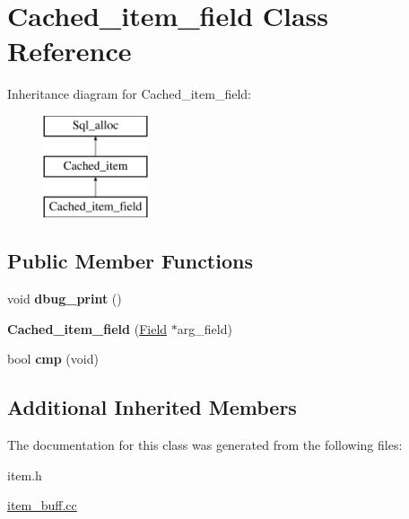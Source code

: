 \hypertarget{classCached__item__field}{}\section{Cached\+\_\+item\+\_\+field Class Reference}
\label{classCached__item__field}
Inheritance diagram for Cached\+\_\+item\+\_\+field\+:\begin{figure}[H]
\begin{center}
\leavevmode
\includegraphics[height=3.000000cm]{classCached__item__field}
\end{center}
\end{figure}
\subsection*{Public Member Functions}
\begin{DoxyCompactItemize}
\item 
\mbox{\label{classCached__item__field_a9cf3c122b4896530d6b5681cc71efb8b}} 
void {\bfseries dbug\+\_\+print} ()
\item 
\mbox{\label{classCached__item__field_a01ba9710ead185987951a3edea4c3ba1}} 
{\bfseries Cached\+\_\+item\+\_\+field} (\mbox{\hyperlink{classField}{Field}} $\ast$arg\+\_\+field)
\item 
\mbox{\label{classCached__item__field_ab549f3dd72850294ca68d203119390e1}} 
bool {\bfseries cmp} (void)
\end{DoxyCompactItemize}
\subsection*{Additional Inherited Members}


The documentation for this class was generated from the following files\+:\begin{DoxyCompactItemize}
\item 
item.\+h\item 
\mbox{\hyperlink{item__buff_8cc}{item\+\_\+buff.\+cc}}\end{DoxyCompactItemize}
